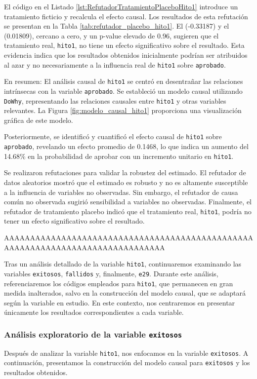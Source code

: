 El código en el Listado \ref{lst:RefutadorTratamientoPlaceboHito1} introduce un tratamiento ficticio y recalcula el efecto causal. Los resultados de esta refutación se presentan en la Tabla \ref{tab:refutador_placebo_hito1}. El  (-0.33187) y el  (0.01809), cercano a cero, y un p-value elevado de 0.96, sugieren que el tratamiento real, \texttt{hito1}, no tiene un efecto significativo sobre el resultado. Esta evidencia indica que los resultados obtenidos inicialmente podrían ser atribuidos al azar y no necesariamente a la influencia real de \texttt{hito1} sobre \texttt{aprobado}.

En resumen: El análisis causal de \texttt{hito1} se centró en desentrañar las relaciones intrínsecas con la variable \texttt{aprobado}. Se estableció un modelo causal utilizando \texttt{DoWhy}, representando las relaciones causales entre \texttt{hito1} y otras variables relevantes. La Figura \ref{fig:modelo_causal_hito1} proporciona una visualización gráfica de este modelo.

Posteriormente, se identificó y cuantificó el efecto causal de \texttt{hito1} sobre \texttt{aprobado}, revelando un efecto promedio de 0.1468, lo que indica un aumento del 14.68\% en la probabilidad de aprobar con un incremento unitario en \texttt{hito1}.

Se realizaron refutaciones para validar la robustez del estimado. El refutador de datos aleatorios mostró que el estimado es robusto y no es altamente susceptible a la influencia de variables no observadas. Sin embargo, el refutador de causa común no observada sugirió sensibilidad a variables no observadas. Finalmente, el refutador de tratamiento placebo indicó que el tratamiento real, \texttt{hito1}, podría no tener un efecto significativo sobre el resultado.


AAAAAAAAAAAAAAAAAAAAAAAAAAAAAAAAAAAAAAAAAAAAAAAAAAAAAAAAAAAAAAAAAAAAAAAAAAAAAAA

Tras un análisis detallado de la variable \texttt{hito1}, continuaremos examinando las variables \texttt{exitosos}, \texttt{fallidos} y, finalmente, \texttt{e29}. Durante este análisis, referenciaremos los códigos empleados para \texttt{hito1}, que permanecen en gran medida inalterados, salvo en la construcción del modelo causal, que se adaptará según la variable en estudio. En este contexto, nos centraremos en presentar únicamente los resultados correspondientes a cada variable.


\subsubsection{Análisis exploratorio de la variable \texttt{exitosos}}
Después de analizar la variable \texttt{hito1}, nos enfocamos en la variable \texttt{exitosos}. A continuación, presentamos la construcción del modelo causal para \texttt{exitosos} y los resultados obtenidos.

